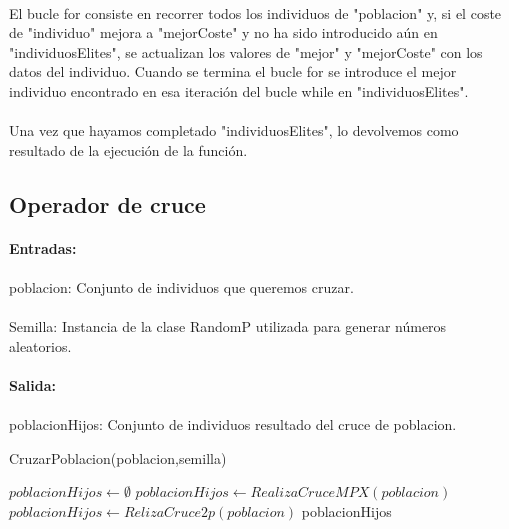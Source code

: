 	\paragraph{}El bucle for consiste en recorrer todos los individuos de "poblacion" y, si el coste de "individuo" mejora a "mejorCoste" y no ha sido introducido aún en "individuosElites", se actualizan los valores de "mejor" y "mejorCoste" con los datos del individuo. Cuando se termina el bucle for se introduce el mejor individuo encontrado en esa iteración del bucle while en "individuosElites".
	
	\paragraph{}Una vez que hayamos completado "individuosElites", lo devolvemos como resultado de la ejecución de la función.
	
	\subsection{Operador de cruce}
	
	\paragraph{Entradas:}
	
	\paragraph{}poblacion: Conjunto de individuos que queremos cruzar.
	
	\paragraph{}Semilla: Instancia de la clase RandomP utilizada para generar números aleatorios.
	
	\paragraph{Salida:}
	
	\paragraph{}poblacionHijos: Conjunto de individuos resultado del cruce de poblacion.

	\begin{algorithm}[H]
		\caption{CruzarPoblacion(poblacion,semilla)}
		\begin{algorithmic}
			\STATE $poblacionHijos \leftarrow \emptyset$
			\STATE $poblacionHijos \leftarrow RealizaCruceMPX(poblacion)$
			\ELSE
			\STATE $poblacionHijos \leftarrow RelizaCruce2p(poblacion)$
			\ENDIF
			\RETURN poblacionHijos
		\end{algorithmic}
	\end{algorithm}

